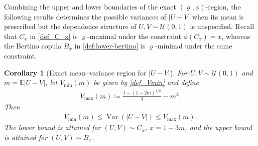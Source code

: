 \documentclass{article}
\newtheorem{corollary}[theorem]{Corollary}
\newcommand{\Var}{\operatorname{Var}}
\newcommand{\E}{\mathbb{E}}
\newcommand{\cU}{\mathcal{U}}
\begin{document}
Combining the upper and lower boundaries of the exact \((\varrho,\phi)\)-region, the following results determines the possible variances of \(|U-V|\) when its mean is prescribed but the dependence structure of \(U,V\sim \cU(0,1)\) is unspecified.
Recall that \(C_x\) in \eqref{def_C_x} is \(\varrho\)-maximal under the constraint \(\phi(C_x)=x\), whereas the Bertino copula \(B_x\) in \eqref{def:lower-bertino} is \(\varrho\)-minimal under the same constraint.

\begin{corollary}[Exact mean--variance region for \(|U-V|\)]
\label{cor:rank-gap-variance}
For \(U,V\sim\cU(0,1)\) and \(m=\E|U-V|\), let \(V_{\operatorname{min}}(m)\) be given by \eqref{def_Vmin} and define
\begin{align}\label{def_Vmax}
    V_{\operatorname{max}}(m)
    \coloneqq
    \frac{1-(1-2m)^{3/2}}{3}-m^2.
\end{align}
Then
\begin{align}\label{eq_cor:rank-gap-variance2}
    V_{\operatorname{min}}(m)
    \leq
    \Var(|U-V|)
    \leq
    V_{\operatorname{max}}(m).
\end{align}
The lower bound is attained for \((U,V)\sim C_x\), \(x=1-3m\), and the upper bound is attained for \((U,V)\sim B_x\).
\end{corollary}
\end{document}
